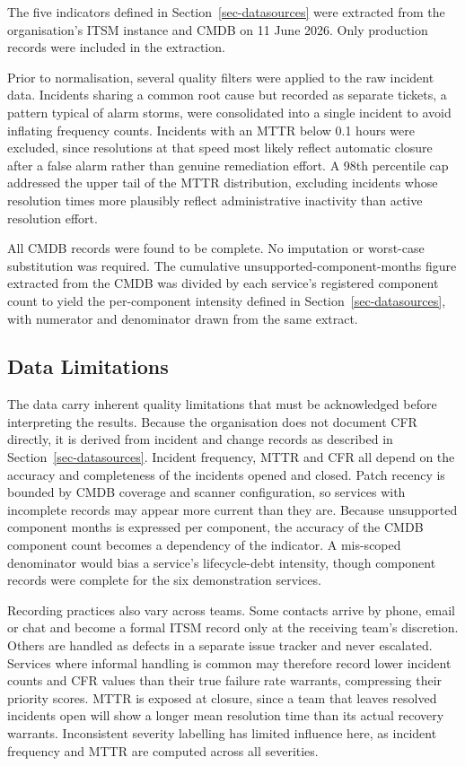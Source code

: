 \documentclass[
  12pt,
  letterpaper,
  12pt,
  oneside,
  english,
  onehalfspacing,
  headsepline]{MastersDoctoralThesis}
\begin{document}
The five indicators defined in Section~\ref{sec-datasources} were
extracted from the organisation's ITSM instance and CMDB on 11 June
2026. Only production records were included in the extraction.

Prior to normalisation, several quality filters were applied to the raw
incident data. Incidents sharing a common root cause but recorded as
separate tickets, a pattern typical of alarm storms, were consolidated
into a single incident to avoid inflating frequency counts. Incidents
with an MTTR below 0.1 hours were excluded, since resolutions at that
speed most likely reflect automatic closure after a false alarm rather
than genuine remediation effort. A 98th percentile cap addressed the
upper tail of the MTTR distribution, excluding incidents whose
resolution times more plausibly reflect administrative inactivity than
active resolution effort.

All CMDB records were found to be complete. No imputation or worst-case
substitution was required. The cumulative unsupported-component-months
figure extracted from the CMDB was divided by each service's registered
component count to yield the per-component intensity defined in
Section~\ref{sec-datasources}, with numerator and denominator drawn from
the same extract.

\subsection{Data Limitations}\label{sec-datalimitations}

The data carry inherent quality limitations that must be acknowledged
before interpreting the results. Because the organisation does not
document CFR directly, it is derived from incident and change records as
described in Section~\ref{sec-datasources}. Incident frequency, MTTR and
CFR all depend on the accuracy and completeness of the incidents opened
and closed. Patch recency is bounded by CMDB coverage and scanner
configuration, so services with incomplete records may appear more
current than they are. Because unsupported component months is expressed
per component, the accuracy of the CMDB component count becomes a
dependency of the indicator. A mis-scoped denominator would bias a
service's lifecycle-debt intensity, though component records were
complete for the six demonstration services.

Recording practices also vary across teams. Some contacts arrive by
phone, email or chat and become a formal ITSM record only at the
receiving team's discretion. Others are handled as defects in a separate
issue tracker and never escalated. Services where informal handling is
common may therefore record lower incident counts and CFR values than
their true failure rate warrants, compressing their priority scores.
MTTR is exposed at closure, since a team that leaves resolved incidents
open will show a longer mean resolution time than its actual recovery
warrants. Inconsistent severity labelling has limited influence here, as
incident frequency and MTTR are computed across all severities.
\end{document}
